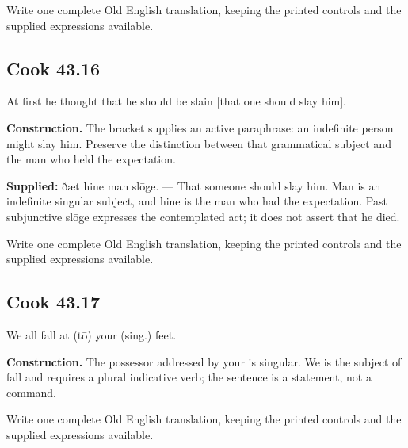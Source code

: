 Write one complete Old English translation, keeping the printed controls and the supplied expressions available.

\par\begin{minipage}{\linewidth}\raggedright
\subsection*{Cook 43.16}

At first he thought that he should be slain [that one should slay him].

\end{minipage}\par\addvspace{4pt}

\textbf{Construction.} The bracket supplies an active paraphrase: an indefinite person might slay him. Preserve the distinction between that grammatical subject and the man who held the expectation.

\textbf{Supplied:} ðæt hine man slōge. — That someone should slay him. Man is an indefinite singular subject, and hine is the man who had the expectation. Past subjunctive slōge expresses the contemplated act; it does not assert that he died.

Write one complete Old English translation, keeping the printed controls and the supplied expressions available.

\par\begin{minipage}{\linewidth}\raggedright
\subsection*{Cook 43.17}

We all fall at (tō) your (sing.) feet.

\textbf{Construction.} The possessor addressed by your is singular. We is the subject of fall and requires a plural indicative verb; the sentence is a statement, not a command.

Write one complete Old English translation, keeping the printed controls and the supplied expressions available.

\end{minipage}\par\addvspace{4pt}

